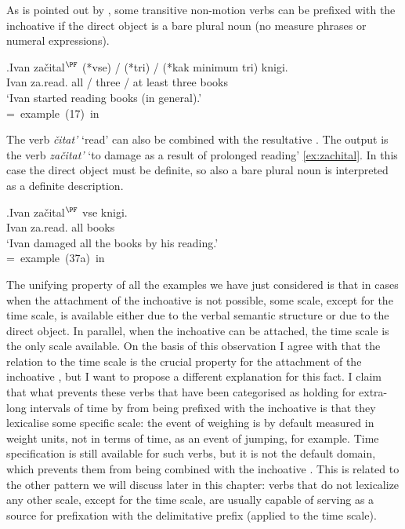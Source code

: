 As is pointed out by \citet[227]{Braginsky:08}, some transitive non-motion verbs can be prefixed with the inchoative  if the direct object is a bare plural noun (no measure phrases or numeral expressions).

\exg.Ivan za\v{c}ital$^{\PF}$ (*vse) / (*tri) / (*kak minimum tri) knigi.\\
Ivan za.read. all / three / at least three books\\
\trans `Ivan started reading books (in general).'\\\hbox{}\hfill\hbox{= example (17) in \citealt[227]{Braginsky:08}}

The verb \textit{\v{c}itat'} `read' can also be combined with the resultative . The output is the verb \textit{za\v{c}itat'} `to damage as a result of prolonged reading' \ref{ex:zachital}. In this case the direct object must be definite, so also a bare plural noun is interpreted as a definite description.

\exg.\label{ex:zachital}Ivan za\v{c}ital$^{\PF}$ vse knigi.\\
Ivan za.read. all books\\
`Ivan damaged all the books by his reading.'\\\hbox{}\hfill\hbox{= example (37a) in \citealt[246]{Braginsky:08}}

The unifying property of all the examples we have just considered is that in cases when the attachment of the inchoative  is not possible, some scale, except for the time scale, is available either due to the verbal semantic structure or due to the direct object. In parallel, when the inchoative  can be attached, the time scale is the only scale available. On the basis of this observation I agree with \citet{Paducheva:96} that the relation to the time scale is the crucial property for the attachment of the inchoative , but I want to propose a different explanation for this fact. I claim that what prevents these verbs that have been categorised as holding for extra-long intervals of time by \citet{Paducheva:96} from being prefixed with the inchoative  is that they lexicalise some specific scale: the event of weighing is by default measured in weight units, not in terms of time, as an event of jumping, for example. Time specification is still available for such verbs, but it is not the default domain, which prevents them from being combined with the inchoative . This is related to the other pattern we will discuss later in this chapter: verbs that do not lexicalize any other scale, except for the time scale, are usually capable of serving as a source for prefixation with the delimitative prefix  (applied to the time scale). 

